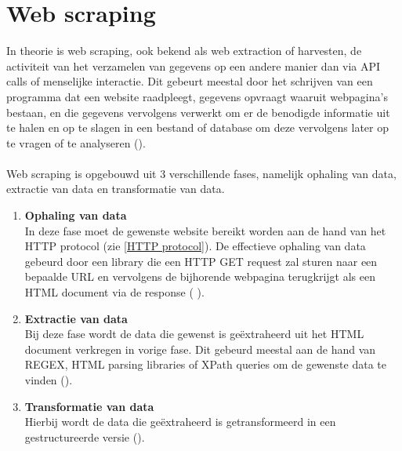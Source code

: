 \section{Web scraping} \label{Web scraping}
In theorie is web scraping, ook bekend als web extraction of harvesten, de activiteit van het verzamelen van gegevens op een andere manier dan via API calls of menselijke interactie. Dit gebeurt meestal door het schrijven van een programma dat een website raadpleegt, gegevens opvraagt waaruit webpagina's bestaan, en die gegevens vervolgens verwerkt om er de benodigde informatie uit te halen en op te slagen in een bestand of database om deze vervolgens later op te vragen of te analyseren (\cite{Mitchell2018,Zhao2017}).
\\
\\
Web scraping is opgebouwd uit 3 verschillende fases, namelijk ophaling van data, extractie van data en transformatie van data. 
\begin{enumerate}
    \item \textbf{Ophaling van data}
\\
In deze fase moet de gewenste website bereikt worden aan de hand van het HTTP protocol (zie \ref{HTTP protocol}). De effectieve ophaling van data gebeurd  door een library die een HTTP GET request zal sturen naar een bepaalde URL en vervolgens de bijhorende webpagina terugkrijgt als een HTML document via de response ( \cite{Persson2019}).
    \item \textbf{Extractie van data}
\\
Bij deze fase wordt de data die gewenst is geëxtraheerd uit het HTML document verkregen in vorige fase. Dit gebeurd meestal aan de hand van REGEX, HTML parsing libraries of XPath queries om de gewenste data te vinden (\cite{Persson2019}).
    \item \textbf{Transformatie van data}
\\
Hierbij wordt de data die geëxtraheerd is getransformeerd in een gestructureerde versie (\cite{Persson2019}).
\end{enumerate}

